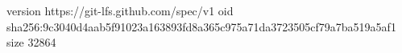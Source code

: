 version https://git-lfs.github.com/spec/v1
oid sha256:9c3040d4aab5f91023a163893fd8a365c975a71da3723505cf79a7ba519a5af1
size 32864
